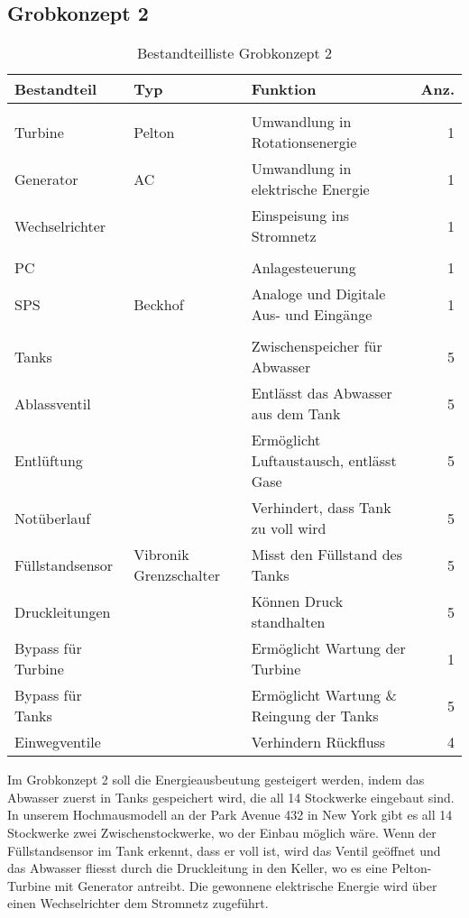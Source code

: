 \subsection{Grobkonzept 2} \label{subsec:grobkonzept2}
\begin{table}[H]
\small
\begin{tabular}{>{\HY\RaggedRight}p{3cm} >{\HY\RaggedRight}p{3.6cm} >{\HY\RaggedRight}p{6.9cm} r}
\hline
\textbf{Bestandteil}&\textbf{Typ}&\textbf{Funktion}&\textbf{Anz.}\\
\hline

\rowcolor{hellgrau}
\multicolumn{4}{l}{\textbf{Stromerzeugung}}\T\\
Turbine&Pelton&Umwandlung in Rotationsenergie&1\\
Generator&AC&Umwandlung in elektrische Energie&1\\
Wechselrichter&&Einspeisung ins Stromnetz&1\B\\

\rowcolor{hellgrau}
\multicolumn{4}{l}{\textbf{Kontrollsystem}}\T\\
PC&&Anlagesteuerung&1\\
SPS&Beckhof&Analoge und Digitale Aus- und Eingänge&1\B\\

\rowcolor{hellgrau}
\multicolumn{4}{l}{\textbf{Abwassertechnik}}\T\\
Tanks&&Zwischenspeicher für Abwasser&5\\
Ablassventil&&Entlässt das Abwasser aus dem Tank&5\\
Entlüftung&&Ermöglicht Luftaustausch, entlässt Gase&5\\
Notüberlauf&&Verhindert, dass Tank zu voll wird&5\\
Füllstandsensor&Vibronik Grenzschalter &Misst den Füllstand des Tanks&5\\
Druckleitungen&&Können Druck standhalten&5\\
Bypass für Turbine&&Ermöglicht Wartung der Turbine&1\\
Bypass für Tanks&&Ermöglicht Wartung \& Reingung der Tanks&5\\
Einwegventile&&Verhindern Rückfluss&4\B\\
\hline
\end{tabular}
\caption{Bestandteilliste Grobkonzept 2}\label{tab:BLGrobkonzept2}
\end{table}
Im Grobkonzept 2 soll die Energieausbeutung gesteigert werden, indem das Abwasser zuerst in Tanks gespeichert wird, die all 14 Stockwerke eingebaut sind. In unserem Hochmausmodell an der Park Avenue 432 in New York gibt es all 14 Stockwerke zwei Zwischenstockwerke, wo der Einbau möglich wäre. Wenn der Füllstandsensor im Tank erkennt, dass er voll ist, wird das Ventil geöffnet und das Abwasser fliesst durch die Druckleitung in den Keller, wo es eine Pelton-Turbine mit Generator antreibt. Die gewonnene elektrische Energie wird über einen Wechselrichter dem Stromnetz zugeführt. \\ 
